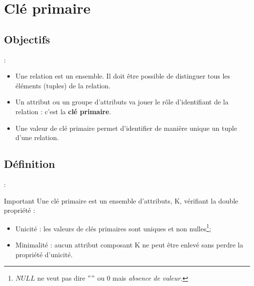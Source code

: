 \documentclass[10pt]{beamer}
\begin{document}
\section{Clé primaire}
\tocss
\subsection{Objectifs}
\begin{frame}{\secname : \subsecname}
    \begin{itemize}
        \item Une relation est un ensemble. Il doit être possible de distinguer tous les éléments (tuples) de la relation.
        \item Un attribut ou un groupe d’attributs va jouer le rôle d’identifiant de la relation : c’est la \textbf{clé primaire}.
        \item Une valeur de clé primaire permet d’identifier de manière unique un tuple d’une relation.
    \end{itemize}
\end{frame}

\subsection{Définition}
\begin{frame}{\secname : \subsecname}
    \begin{alertblock}{Important}
        Une clé primaire est un ensemble d’attributs, K, vérifiant la double propriété :
        \begin{itemize}
            \item Unicité : les valeurs de clés primaires sont uniques et non nulles\footnote{$NULL$ ne veut pas dire $""$ ou $0$ mais \emph{absence de valeur}.};
            \item Minimalité : aucun attribut composant K ne peut être enlevé sans perdre la propriété d’unicité.
        \end{itemize}
    \end{alertblock}
\end{frame}
\end{document}
